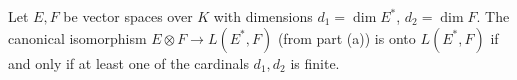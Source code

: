 Let $E, F$ be vector spaces over $K$ with dimensions $d_1 = \dim E^*$, $d_2 = \dim F$. The canonical isomorphism $E \otimes F \to L(E^*, F)$ (from part (a)) is onto $L(E^*, F)$ if and only if at least one of the cardinals $d_1, d_2$ is finite.
